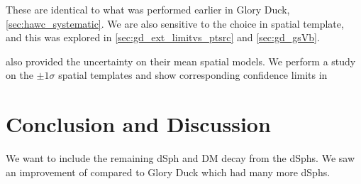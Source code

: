 These are identical to what was performed earlier in Glory Duck, \cref{sec:hawc_systematic}.
We are also sensitive to the choice in spatial template, and this was explored in \cref{sec:gd_ext_limitvs_ptsrc} and \cref{sec:gd_gsVb}.

\LS also provided the uncertainty on their mean spatial models.
We perform a study on the $\pm 1\sigma$ spatial templates and show corresponding confidence limits in 


\section{Conclusion and Discussion}\label{sec:mtd_conclusion}

We want to include the remaining dSph and DM decay from the dSphs.
We saw an improvement of  compared to Glory Duck which had many more dSphs.
